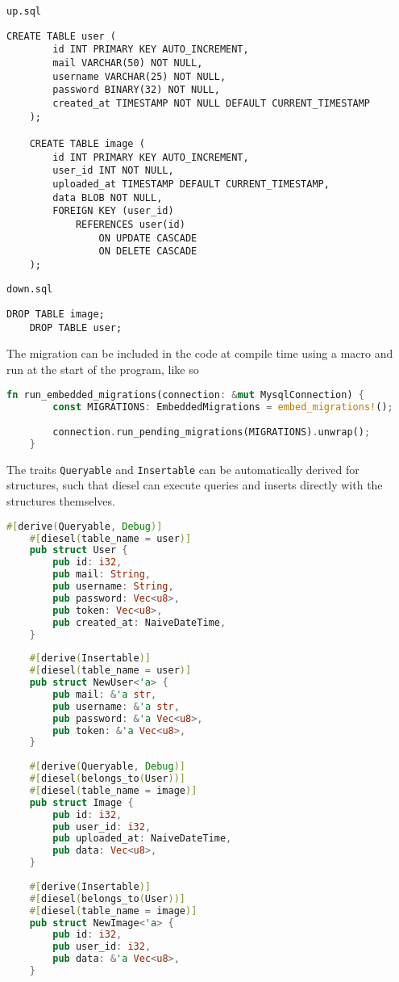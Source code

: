 \documentclass[../documentation.tex]{subfiles}
\begin{document}
\texttt{up.sql}
\begin{lstlisting}[style=sql]
    CREATE TABLE user (
        id INT PRIMARY KEY AUTO_INCREMENT,
        mail VARCHAR(50) NOT NULL,
        username VARCHAR(25) NOT NULL,
        password BINARY(32) NOT NULL,
        created_at TIMESTAMP NOT NULL DEFAULT CURRENT_TIMESTAMP
    );
    
    CREATE TABLE image (
        id INT PRIMARY KEY AUTO_INCREMENT,
        user_id INT NOT NULL,
        uploaded_at TIMESTAMP DEFAULT CURRENT_TIMESTAMP,
        data BLOB NOT NULL,
        FOREIGN KEY (user_id)
            REFERENCES user(id)
                ON UPDATE CASCADE
                ON DELETE CASCADE
    );
\end{lstlisting}

\texttt{down.sql}
\begin{lstlisting}[style=sql]
    DROP TABLE image;
    DROP TABLE user;
\end{lstlisting}

The migration can be included in the code at compile time using a macro and run
at the start of the program, like so
\begin{lstlisting}[language=Rust, style=boxed, numbers=none]
    fn run_embedded_migrations(connection: &mut MysqlConnection) {
        const MIGRATIONS: EmbeddedMigrations = embed_migrations!();

        connection.run_pending_migrations(MIGRATIONS).unwrap();
    }
\end{lstlisting}

The traits \texttt{Queryable} and \texttt{Insertable} can be automatically derived
for structures, such that diesel can execute queries and inserts directly with the structures
themselves.

\begin{lstlisting}[language=Rust, style=boxed, numbers=none]
    #[derive(Queryable, Debug)]
    #[diesel(table_name = user)]
    pub struct User {
        pub id: i32,
        pub mail: String,
        pub username: String,
        pub password: Vec<u8>,
        pub token: Vec<u8>,
        pub created_at: NaiveDateTime,
    }
    
    #[derive(Insertable)]
    #[diesel(table_name = user)]
    pub struct NewUser<'a> {
        pub mail: &'a str,
        pub username: &'a str,
        pub password: &'a Vec<u8>,
        pub token: &'a Vec<u8>,
    }
    
    #[derive(Queryable, Debug)]
    #[diesel(belongs_to(User))]
    #[diesel(table_name = image)]
    pub struct Image {
        pub id: i32,
        pub user_id: i32,
        pub uploaded_at: NaiveDateTime,
        pub data: Vec<u8>,
    }
    
    #[derive(Insertable)]
    #[diesel(belongs_to(User))]
    #[diesel(table_name = image)]
    pub struct NewImage<'a> {
        pub id: i32,
        pub user_id: i32,
        pub data: &'a Vec<u8>,
    }
\end{lstlisting}
\end{document}
